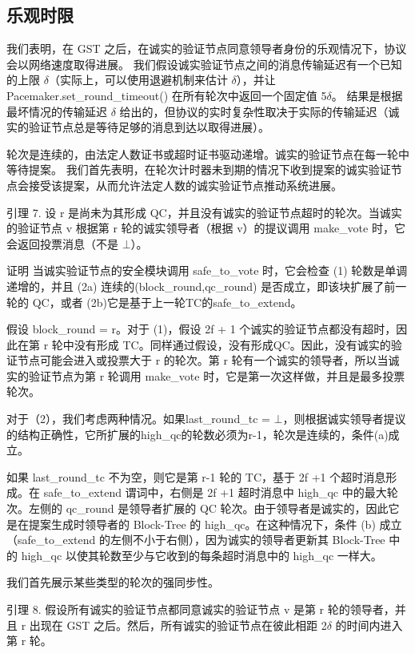 \subsection{乐观时限}

我们表明，在 GST 之后，在诚实的验证节点同意领导者身份的乐观情况下，协议会以网络速度取得进展。 我们假设诚实验证节点之间的消息传输延迟有一个已知的上限 $\delta$（实际上，可以使用退避机制来估计 $\delta$），并让 Pacemaker.set\_round\_timeout() 在所有轮次中返回一个固定值 5$\delta$。 结果是根据最坏情况的传输延迟 $\delta$ 给出的，但协议的实时复杂性取决于实际的传输延迟（诚实的验证节点总是等待足够的消息到达以取得进展）。

轮次是连续的，由法定人数证书或超时证书驱动递增。诚实的验证节点在每一轮中等待提案。 我们首先表明，在轮次计时器未到期的情况下收到提案的诚实验证节点会接受该提案，从而允许法定人数的诚实验证节点推动系统进展。

引理 7. 设 r 是尚未为其形成 QC，并且没有诚实的验证节点超时的轮次。当诚实的验证节点 v 根据第 r 轮的诚实领导者（根据 v）的提议调用 make\_vote 时，它​​会返回投票消息（不是 $\bot$）。

证明 当诚实验证节点的安全模块调用 safe\_to\_vote 时，它​​会检查 (1) 轮数是单调递增的，并且 (2a) 连续的(block\_round,qc\_round) 是否成立，即该块扩展了前一轮的 QC，或者 (2b)它是基于上一轮TC的safe\_to\_extend。

假设 block\_round = r。对于 (1)，假设 2f + 1 个诚实的验证节点都没有超时，因此在第 r 轮中没有形成 TC。同样通过假设，没有形成QC。因此，没有诚实的验证节点可能会进入或投票大于 r 的轮次。第 r 轮有一个诚实的领导者，所以当诚实的验证节点为第 r 轮调用 make\_vote 时，它​​是第一次这样做，并且是最多投票轮次。

对于（2），我们考虑两种情况。如果last\_round\_tc = $\bot$，则根据诚实领导者提议的结构正确性，它所扩展的high\_qc的轮数必须为r-1，轮次是连续的，条件(a)成立。

如果 last\_round\_tc 不为空，则它是第 r-1 轮的 TC，基于 2f +1 个超时消息形成。在 safe\_to\_extend 谓词中，右侧是 2f +1 超时消息中 high\_qc 中的最大轮次。左侧的 qc\_round 是领导者扩展的 QC 轮次。由于领导者是诚实的，因此它是在提案生成时领导者的 Block-Tree 的 high\_qc。在这种情况下，条件 (b) 成立（safe\_to\_extend 的左侧不小于右侧），因为诚实的领导者更新其 Block-Tree 中的 high\_qc 以使其轮数至少与它收到的每条超时消息中的 high\_qc 一样大。

我们首先展示某些类型的轮次的强同步性。

引理 8. 假设所有诚实的验证节点都同意诚实的验证节点 v 是第 r 轮的领导者，并且 r 出现在 GST 之后。然后，所有诚实的验证节点在彼此相距 2$\delta$ 的时间内进入第 r 轮。

